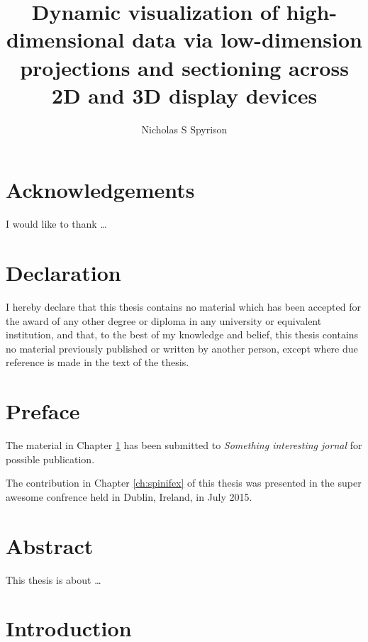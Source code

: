 \documentclass{monashthesis}
\author{Nicholas S Spyrison}
\title{Dynamic visualization of high-dimensional data via low-dimension
projections and sectioning across 2D and 3D display devices}
\begin{document}

\titlepage

{\sf\tighttoc\doublespacing}

\chapter*{Acknowledgements}\label{acknowledgements}

I would like to thank \dots

\chapter*{Declaration}\label{declaration}

I hereby declare that this thesis contains no material which has been
accepted for the award of any other degree or diploma in any university
or equivalent institution, and that, to the best of my knowledge and
belief, this thesis contains no material previously published or written
by another person, except where due reference is made in the text of the
thesis.

\vspace*{2cm}\par\authorname

\chapter*{Preface}\label{preface}

The material in Chapter \ref{ch:intro} has been submitted to
\emph{Something interesting jornal} for possible publication.

The contribution in Chapter \ref{ch:spinifex} of this thesis was
presented in the super awesome confrence held in Dublin, Ireland, in
July 2015.

\chapter*{Abstract}\label{abstract}

This thesis is about \ldots{}

\clearpage{}\setcounter{page}{0}

\chapter{Introduction}\label{ch:intro}
\end{document}
